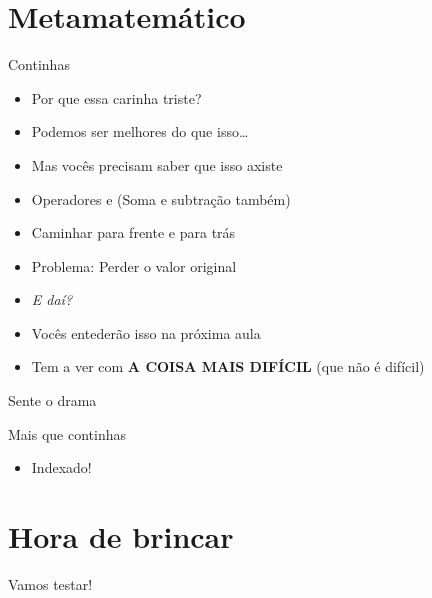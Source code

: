 \documentclass[14pt]{beamer}
\begin{document}
	\section{Metamatemático \frownie}
		\begin{frame}{Continhas}
			\begin{itemize}
				\presentationPause\item Por que essa carinha triste? \presentationPause\frownie
				\presentationPause\item Podemos ser melhores do que isso\dots
				\presentationPause\item Mas vocês precisam saber que isso axiste
				\presentationPause\item Operadores \basicCode{++} e \basicCode{--} \presentationPause (Soma e subtração também)
				\presentationPause\item Caminhar para frente e para trás
				\presentationPause\item Problema: \presentationPause Perder o valor original
				\presentationPause\item \textit{E daí?}
				\presentationPause\item Vocês entederão isso na próxima aula
				\presentationPause\item Tem a ver com \textbf{\presentationPause A \presentationPause COISA \presentationPause MAIS \presentationPause DIFÍCIL} \presentationPause (que não é difícil)
			\end{itemize}
		\end{frame}

		\begin{frame}{Sente o drama}
			\presentationPause
		\end{frame}

		\begin{frame}{Mais que continhas}
			\begin{itemize}
				\presentationPause\item Indexado!
			\end{itemize}
			\presentationPause
		\end{frame}
		
	\section{Hora de brincar}
		\begin{frame}
			\begin{center}\Huge
				Vamos testar!
			\end{center}
		\end{frame}

	
\end{document}
